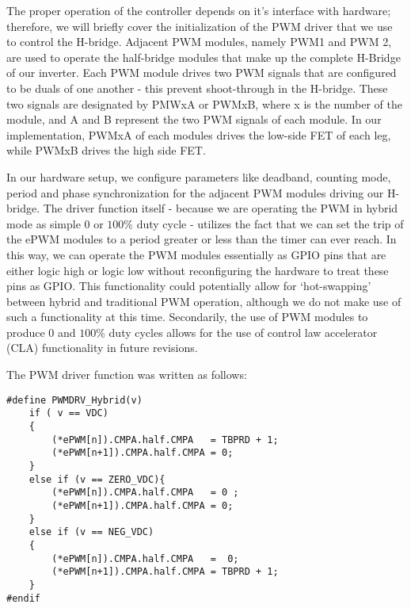 The proper operation of the controller depends on it's interface with hardware; therefore, we will briefly cover the initialization of the PWM driver that we use to control the H-bridge. Adjacent PWM modules, namely PWM1 and PWM 2, are used to operate the half-bridge modules that make up the complete H-Bridge of our inverter. Each PWM module drives two PWM signals that are configured to be duals of one another - this prevent shoot-through in the H-bridge. These two signals are designated by PMWxA or PWMxB, where x is the number of the module, and A and B represent the two PWM signals of each module. In our implementation, PWMxA of each modules drives the low-side FET of each leg, while PWMxB drives the high side FET. 

In our hardware setup, we configure parameters like deadband, counting mode, period and phase synchronization for the adjacent PWM modules driving our H-bridge. The driver function itself - because we are operating the PWM in hybrid mode as simple $0$ or $100\%$ duty cycle - utilizes the fact that we can set the trip of the ePWM modules to a period greater or less than the timer can ever reach. In this way, we can operate the PWM modules essentially as GPIO pins that are either logic high or logic low without reconfiguring the hardware to treat these pins as GPIO. This functionality could potentially allow for `hot-swapping' between hybrid and traditional PWM operation, although we do not make use of such a functionality at this time. Secondarily, the use of PWM modules to produce $0$ and $100\%$ duty cycles allows for the use of control law accelerator (CLA) functionality in future revisions. 

The PWM driver function was written as follows:
\begin{lstlisting}
#define PWMDRV_Hybrid(v)
	if ( v == VDC)
	{
		(*ePWM[n]).CMPA.half.CMPA	= TBPRD + 1;
		(*ePWM[n+1]).CMPA.half.CMPA	= 0;
	}
	else if (v == ZERO_VDC){
		(*ePWM[n]).CMPA.half.CMPA	= 0 ;
		(*ePWM[n+1]).CMPA.half.CMPA	= 0;
	}
	else if (v == NEG_VDC)
	{
		(*ePWM[n]).CMPA.half.CMPA	=  0;
		(*ePWM[n+1]).CMPA.half.CMPA	= TBPRD + 1;
	}
#endif
\end{lstlisting}

